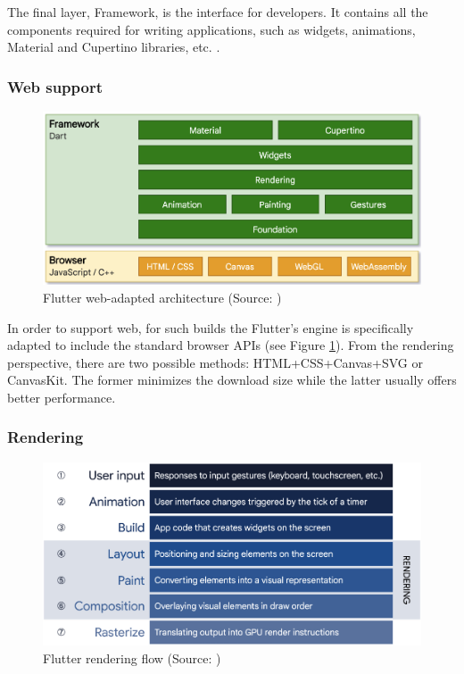 The final layer, Framework, is the interface for developers. It contains all the components required for writing applications, such as widgets, animations, Material and Cupertino libraries, etc. \cite{flutter_docs_architecture}.

\subsubsection*{Web support}

\begin{figure}[h]
	\centering
	\includegraphics[width=.77\textwidth]{img/flutter_web_architecture}
	\caption{Flutter web-adapted architecture (Source: \cite{flutter_docs_architecture})}
	\label{fig:flutter_web_architecture}
\end{figure}

In order to support web, for such builds the Flutter's engine is specifically adapted to include the standard browser APIs (see Figure \ref{fig:flutter_web_architecture}). From the rendering perspective, there are two possible methods: HTML+CSS+Canvas+SVG or CanvasKit. The former minimizes the download size while the latter usually offers better performance.

\subsubsection*{Rendering}

\begin{figure}[h]
	\centering
	\includegraphics[width=\textwidth]{img/flutter_render_pipeline}
	\caption{Flutter rendering flow (Source: \cite{flutter_docs_architecture})}
	\label{fig:flutter_render_flow}
\end{figure}

